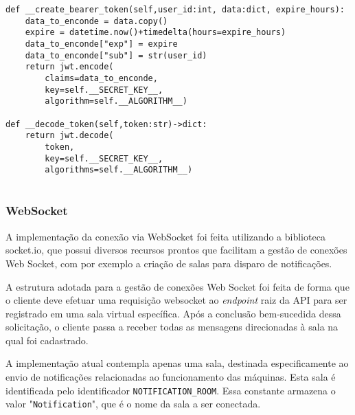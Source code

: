 \begin{verbatim}
def __create_bearer_token(self,user_id:int, data:dict, expire_hours):
    data_to_enconde = data.copy()
    expire = datetime.now()+timedelta(hours=expire_hours)
    data_to_enconde["exp"] = expire
    data_to_enconde["sub"] = str(user_id)
    return jwt.encode(
        claims=data_to_enconde,
        key=self.__SECRET_KEY__,
        algorithm=self.__ALGORITHM__)

def __decode_token(self,token:str)->dict:
    return jwt.decode(
        token,
        key=self.__SECRET_KEY__,
        algorithms=self.__ALGORITHM__)
    
\end{verbatim}







\subsubsection{WebSocket}\label{subsubsec:WebSocketImplement}
A implementação da conexão via WebSocket foi feita utilizando a biblioteca socket.io, que possui diversos recursos prontos que facilitam a gestão de conexões Web Socket, com por exemplo a criação de salas para disparo de notificações.

A estrutura adotada para a gestão de conexões Web Socket foi feita de forma que o cliente deve efetuar uma requisição websocket ao \textit{endpoint} raiz da API para ser registrado em uma sala virtual específica. Após a conclusão bem-sucedida dessa solicitação, o cliente passa a receber todas as mensagens direcionadas à sala na qual foi cadastrado.

A implementação atual contempla apenas uma sala, destinada especificamente ao envio de notificações relacionadas ao funcionamento das máquinas. Esta sala é identificada pelo identificador \texttt{NOTIFICATION\_ROOM}. Essa constante armazena o valor "\texttt{Notification}", que é o nome da sala a ser conectada.

